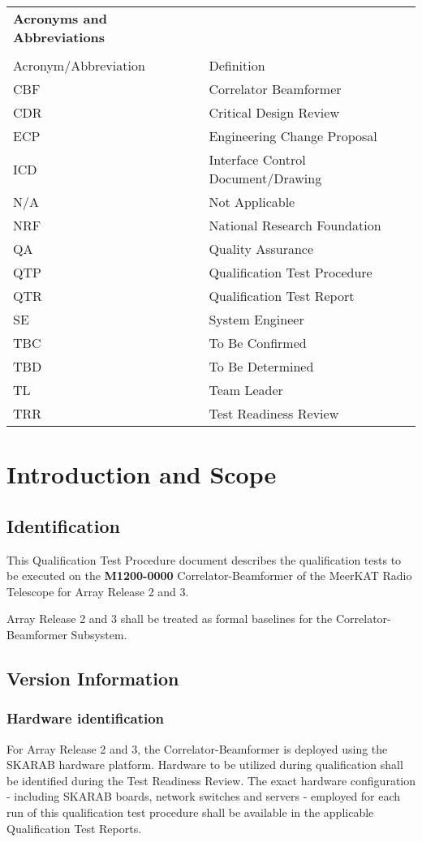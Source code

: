 \begin{longtable}{ll}
	{\bf\LARGE Acronyms and Abbreviations} & \\\\
	Acronym/Abbreviation & Definition \\
	CBF & Correlator Beamformer \\
	CDR & Critical Design Review \\
	ECP & Engineering Change Proposal \\
	ICD & Interface Control Document/Drawing \\
	N/A & Not Applicable \\
	NRF & National Research Foundation \\
	QA  & Quality Assurance \\
	QTP & Qualification Test Procedure \\
	QTR & Qualification Test Report \\
	SE  & System Engineer \\
	TBC & To Be Confirmed \\
	TBD & To Be Determined \\
	TL  & Team Leader \\
	TRR & Test Readiness Review \\
\end{longtable}

\chapter{Introduction and Scope}
\section{Identification}
This Qualification Test Procedure document describes the qualification tests to be executed on the {\bf M1200-0000} Correlator-Beamformer of the MeerKAT Radio Telescope for Array Release 2 and 3.

Array Release 2 and 3 shall be treated as formal baselines for the Correlator-Beamformer Subsystem.
\section{Version Information}
\subsection{Hardware identification}
For Array Release 2 and 3, the Correlator-Beamformer is deployed using the SKARAB hardware platform. Hardware to be utilized during qualification shall be identified during the Test Readiness Review. The exact hardware configuration - including SKARAB boards, network switches and servers - employed for each run of this qualification test procedure shall be available in the applicable Qualification Test Reports.
